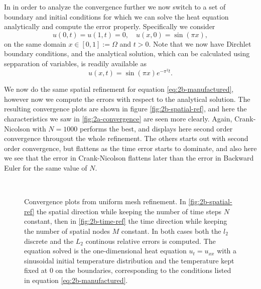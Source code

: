 In in order to analyze the convergence further we now switch to a set of boundary and initial conditions for which we can solve the heat equation analytically and compute the error properly. 
Specifically we consider 
\begin{equation}
    u(0,t) = u(1,t) = 0, \quad u(x,0) = \sin(\pi x), 
    \label{eq:2b-manufactured}
\end{equation}
on the same domain $x \in [0,1] := \Omega$ and $t > 0$. 
Note that we now have Dirchlet boundary conditions, 
and the analytical solution, 
which can be calculated using sepparation of variables\cite{TODO}, 
is readily available as
\begin{equation}
    u(x,t) = \sin(\pi x)  e^{- \pi^2 t}.
\end{equation}

We now do the same spatial refinement for equation \eqref{eq:2b-manufactured}, 
however now we compute the errors with respect to the analytical solution. 
The resulting convergence plots are shown in figure \ref{fig:2b-spatial-ref}, 
and here the characteristics we saw in \ref{fig:2a-convergence} are seen more clearly. 
Again, Crank-Nicolson with $N=1000$ performs the best, 
and displays here second order convergence througout the whole refinement. 
The others starts out with second order convergence, 
but flattens as the time error starts to dominate, 
and also here we see that the error in Crank-Nicolson flattens later than the error in Backward Euler for the same value of $N$. 
\begin{figure}
    \centering
    \label{fig:2b-spatial-temporal-ref}
     \\ \medskip
    \caption{
        Convergence plots from uniform mesh refinement. 
        In \ref{fig:2b-spatial-ref} the spatial direction while keeping the number of time steps $N$ constant, 
        then in \ref{fig:2b-time-ref} the time direction while keeping the number of spatial nodes $M$ constant. 
        In both cases 
        both the $l_2$ discrete and the $L_2$ continous relative errors is computed. 
        The equation solved is the one-dimensional heat equation $u_t=u_{xx}$ 
        with a sinusoidal initial temperature distribution and the temperature kept fixed at $0$ 
        on the boundaries, 
        corresponding to the conditions listed in equation \eqref{eq:2b-manufactured}. 
    }
\end{figure}

